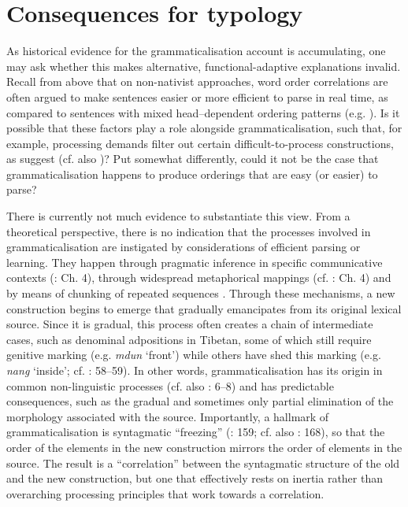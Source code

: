 \documentclass[output=paper]{langsci/langscibook}
\begin{document}
\section{Consequences for typology}\label{sec:collins:3}

As historical evidence for the grammaticalisation account is accumulating, one may ask whether this makes alternative, functional-adaptive explanations invalid. Recall from above that on non-nativist approaches, word order correlations are often argued to make sentences easier or more efficient to parse in real time, as compared to sentences with mixed head–dependent ordering patterns (e.g. \citealt{Hawkins2004}). Is it possible that these factors play a role alongside grammaticalisation, such that, for example, processing demands filter out certain difficult-to-process constructions, as \citet{KirbyHurford1997} suggest (cf. also \citealt{Christiansen2000})? Put somewhat differently, could it not be the case that grammaticalisation happens to produce orderings that are easy (or easier) to parse?

There is currently not much evidence to substantiate this view. From a theoretical perspective, there is no indication that the processes involved in grammaticalisation are instigated by considerations of efficient parsing or learning. They happen through pragmatic inference in specific communicative contexts (\citealt{HopperTraugott2003}: Ch. 4), through widespread metaphorical mappings (cf. \citealt{Deutscher2005}: Ch. 4) and by means of chunking of repeated sequences \citep{Bybee2002}. Through these mechanisms, a new construction begins to emerge that gradually emancipates from its original lexical source. Since it is gradual, this process often creates a chain of intermediate cases, such as denominal adpositions in Tibetan, some of which still require genitive marking (e.g. \textit{mdun} ‘front’) while others have shed this marking (e.g. \textit{nang} ‘inside’; cf. \citealt{DeLancey1997}: 58–59). In other words, grammaticalisation has its origin in common non-linguistic processes (cf. also \citealt{Bybee2010}: 6–8) and has predictable consequences, such as the gradual and sometimes only partial elimination of the morphology associated with the source. Importantly, a hallmark of grammaticalisation is syntagmatic “freezing” (\citealt{Croft2000}: 159; cf. also \citealt{Lehmann2015}: 168), so that the order of the elements in the new construction mirrors the order of elements in the source. The result is a “correlation” between the syntagmatic structure of the old and the new construction, but one that effectively rests on inertia rather than overarching processing principles that work towards a correlation.
\end{document}
